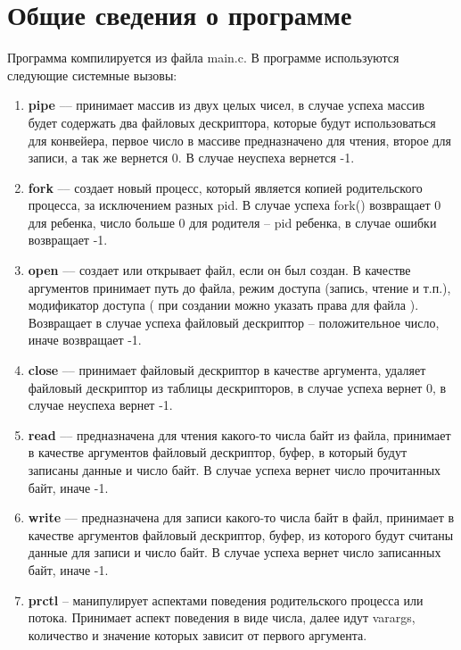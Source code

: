 \section{Общие сведения о программе}

Программа компилируется из файла main.c. В программе используются следующие системные вызовы:

\begin{enumerate}
    \item \textbf{pipe} –– принимает массив из двух целых чисел, в случае успеха массив будет содержать два файловых дескриптора, которые будут использоваться для конвейера, первое число в массиве предназначено для чтения, второе для записи, а так же вернется 0. В случае неуспеха вернется -1.
    \item \textbf{fork} –– создает новый процесс, который является копией родительского процесса, за исключением разных pid. В случае успеха fork() возвращает 0 для ребенка, число больше 0 для родителя – pid ребенка, в случае ошибки возвращает -1.
    \item \textbf{open} –– создает или открывает файл, если он был создан. В качестве аргументов принимает путь до файла, режим доступа (запись, чтение и т.п.),  модификатор доступа ( при создании можно указать права для файла ). Возвращает в случае успеха файловый дескриптор – положительное число, иначе возвращает -1.
    \item \textbf{close} –– принимает файловый дескриптор в качестве аргумента, удаляет файловый дескриптор из таблицы дескрипторов, в случае успеха вернет 0, в случае неуспеха вернет -1.
    \item \textbf{read} –– предназначена для чтения какого-то числа байт из файла, принимает в качестве аргументов файловый дескриптор, буфер, в который будут записаны данные и число байт. В случае успеха вернет число прочитанных байт, иначе -1.
    \item \textbf{write} –– предназначена для записи какого-то числа байт в файл, принимает в качестве аргументов файловый дескриптор, буфер, из которого будут считаны данные для записи и число байт. В случае успеха вернет число записанных байт, иначе -1.
    \item \textbf{prctl} -- манипулирует аспектами поведения родительского процесса или потока. Принимает аспект поведения в виде числа, далее идут varargs, количество и значение которых зависит от первого аргумента.
\end{enumerate}

\pagebreak

